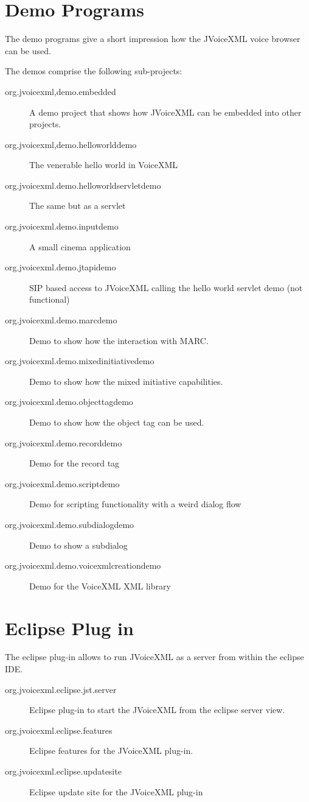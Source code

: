 \documentclass[11pt,a4paper]{article}
\begin{document}
\section{Demo Programs}

The demo programs give a short impression how the JVoiceXML voice browser can
be used.

The demos comprise the following sub-projects:

\begin{description}
\item[org.jvoicexml,demo.embedded] A demo project that shows how JVoiceXML can
be embedded into other projects.
\item[org.jvoicexml,demo.helloworlddemo] The venerable hello world in Voice\-XML
\item[org.jvoicexml.demo.helloworldservletdemo] The same but as a servlet
\item[org.jvoicexml.demo.inputdemo] A small cinema application
\item[org.jvoicexml.demo.jtapidemo] SIP based access to JVoiceXML calling the
hello world servlet demo (not functional)
\item[org.jvoicexml.demo.marcdemo] Demo to show how the interaction with MARC.
\item[org.jvoicexml.demo.mixedinitiativedemo] Demo to show how the mix\-ed
initiative capabilities.
\item[org.jvoicexml.demo.objecttagdemo] Demo to show how the object tag can be
used.
\item[org.jvoicexml.demo.recorddemo] Demo for the record tag
\item[org.jvoicexml.demo.scriptdemo] Demo for scripting functionality with a
weird dialog flow
\item[org.jvoicexml.demo.subdialogdemo] Demo to show a subdialog
\item[org.jvoicexml.demo.voicexmlcreationdemo] Demo for the VoiceXML XML library
\end{description}

\section{Eclipse Plug in}

The eclipse plug-in allows to run JVoiceXML as a server from within the eclipse
IDE.

\begin{description}
\item[org.jvoicexml.eclipse.jst.server] Eclipse plug-in to start the JVoiceXML
from the eclipse server view.
\item[org.jvoicexml.eclipse.features] Eclipse features for the JVoiceXML
plug-in.
\item[org.jvoicexml.eclipse.updatesite] Eclipse update site for the
JVoiceXML plug-in
\end{description}
\end{document}
